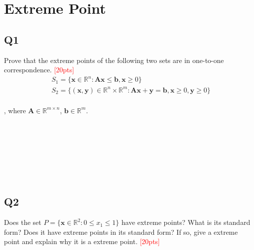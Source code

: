 \documentclass[10pt]{article}
\begin{document}
\newpage

\section{Extreme Point}
\subsection{Q1}
Prove that the extreme points of the following two sets are in one-to-one correspondence.
\textcolor{red}{[20pts]}
\begin{equation}
	\begin{aligned}
		& S_{1} = \{ \bm{x} \in \mathbb{R}^{n} : \bm{Ax} \leq \bm{b}, \bm{x} \geq 0 \} \\
		& S_{2} = \{ \bm{(x, y)} \in \mathbb{R}^{n} \times \mathbb{R}^{m} : \bm{Ax} + \bm{y} = \bm{b}, \bm{x} \geq 0, \bm{y} \geq 0 \} \\
	\end{aligned}
\end{equation}
 
, where $\bm{A} \in \mathbb{R}^{m \times n}$, $\bm{b} \in \mathbb{R}^{m}$.

~\\
~\\
~\\
~\\
~\\
~\\

\newpage
\subsection{Q2}
Does the set $P = \{ \bm{x} \in \mathbb{R}^{2} : 0 \leq x_{1} \leq 1 \}$ have extreme points? What is its standard form? Does it have extreme points in its standard form? If so, give a extreme point and explain why it is a extreme point.
\textcolor{red}{[20pts]}
\end{document}
